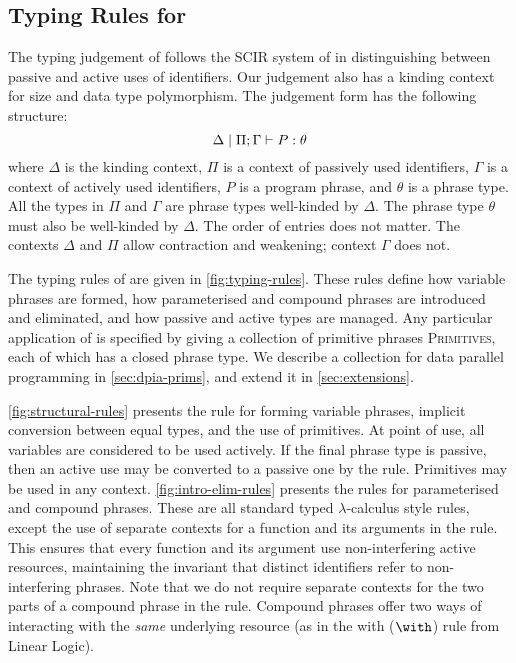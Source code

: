 \subsection{Typing Rules for \DPIA}
\label{sec:typing-rules}

The typing judgement of \DPIA follows the SCIR system of \citet{OHearnPTT99} in distinguishing between passive and active uses of identifiers. Our judgement also has a kinding context for size and data type polymorphism. The judgement form has the following structure:
\begin{displaymath}
  \Delta \mid \Pi; \Gamma \vdash P : \theta
\end{displaymath}
where $\Delta$ is the kinding context, $\Pi$ is a context of passively used identifiers, $\Gamma$ is a context of actively used identifiers, $P$ is a program phrase, and $\theta$ is a phrase type. All the types in $\Pi$ and $\Gamma$ are phrase types well-kinded by $\Delta$. The phrase type $\theta$ must also be well-kinded by $\Delta$. The order of entries does not matter. The contexts $\Delta$ and $\Pi$ allow contraction and weakening; context $\Gamma$ does not.

The typing rules of \DPIA are given in \autoref{fig:typing-rules}. These rules define how variable phrases are formed, how parameterised and compound phrases are introduced and eliminated, and how passive and active types are managed. Any particular application of \DPIA is specified by giving a collection of primitive phrases \textsc{Primitives}, each of which has a closed phrase type. We describe a collection for data parallel programming in \autoref{sec:dpia-prims}, and extend it in \autoref{sec:extensions}.

\autoref{fig:structural-rules} presents the rule for forming variable phrases, implicit conversion between equal types, and the use of primitives. At point of use, all variables are considered to be used actively. If the final phrase type is passive, then an active use may be converted to a passive one by the  rule. Primitives may be used in any context. \autoref{fig:intro-elim-rules} presents the rules for parameterised and compound phrases. These are all standard typed $\lambda$-calculus style rules, except the use of separate contexts for a function and its arguments in the  rule. This ensures that every function and its argument use non-interfering active resources, maintaining the invariant that distinct identifiers refer to non-interfering phrases. Note that we do not require separate contexts for the two parts of a compound phrase in the  rule. Compound phrases offer two ways of interacting with the \emph{same} underlying resource (as in the with ($\with$) rule from Linear Logic).

